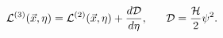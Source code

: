 \begin{equation}
{\cal L}^{(3)}(\vec{x},\eta) = {\cal L}^{(2)}(\vec{x},\eta) + \frac{d {\cal D}}{d\eta}, 
~~~~~{\cal D} =  \frac{ {\cal H}}{2} \psi^2.
\label{totder}
\end{equation}

